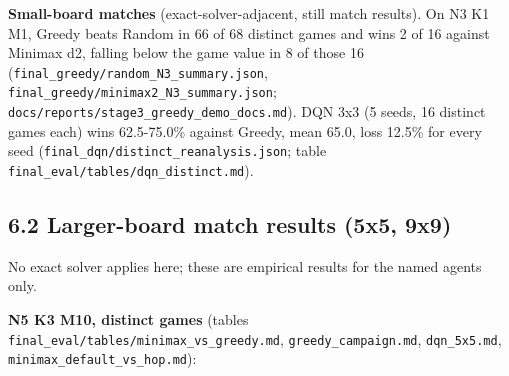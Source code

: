 \documentclass[11pt]{article}
\begin{document}
\textbf{Small-board matches} (exact-solver-adjacent, still match results). On N3 K1 M1, Greedy beats
Random in 66 of 68 distinct games and wins 2 of 16 against Minimax d2, falling below the game
value in 8 of those 16 (\texttt{final\_greedy/random\_N3\_summary.json}, \texttt{final\_greedy/minimax2\_N3\_summary.json};
\texttt{docs/reports/stage3\_greedy\_demo\_docs.md}). DQN 3x3 (5 seeds, 16 distinct games each) wins
62.5-75.0\% against Greedy, mean 65.0, loss 12.5\% for every seed (\texttt{final\_dqn/distinct\_reanalysis.json};
table \texttt{final\_eval/tables/dqn\_distinct.md}).

\subsection{6.2 Larger-board match results (5x5, 9x9)}

No exact solver applies here; these are empirical results for the named agents only.

\textbf{N5 K3 M10, distinct games} (tables \texttt{final\_eval/tables/minimax\_vs\_greedy.md},
\texttt{greedy\_campaign.md}, \texttt{dqn\_5x5.md}, \texttt{minimax\_default\_vs\_hop.md}):
\end{document}
